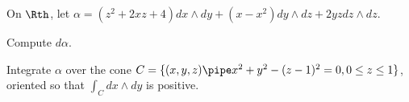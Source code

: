On $\Rth$, let $\alpha=(z^2+2xz+4)dx\wedge dy+(x-x^2)dy\wedge dz+2yz
dz\wedge dz$.
\begin{alist}
\item Compute $d\alpha$.
\item Integrate $\alpha$ over the cone $C=\{(x,y,z)\pipe
x^2+y^2-(z-1)^2=0, 0\leq z\leq 1\}$, oriented so that $\int_C dx\wedge
dy$ is positive.
\end{alist}
